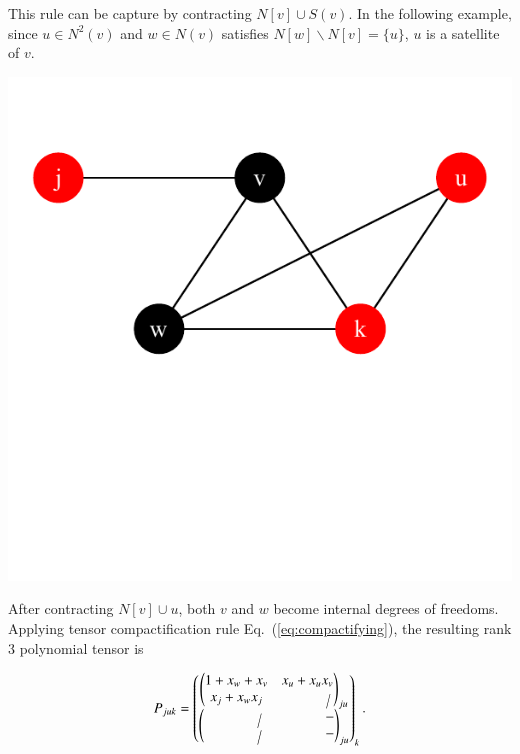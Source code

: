\documentclass[review,onefignum,onetabnum]{siamart190516}
\newcommand{\<}{\langle}
\renewcommand{\>}{\rangle}
\newcommand{\Eq}[1]{Eq.~(\ref{#1})}
\newcounter{example}
\begin{document}
This rule can be capture by contracting $N[v] \cup S(v)$.
In the following example, since $u \in N^2(v)$ and $w \in N(v)$ satisfies $N[w] \backslash N[v] = \{u\}$, $u$ is a satellite of $v$.

\centerline{\includegraphics[width=0.4\columnwidth,trim={0 3.5cm 0 1cm},clip]{../notebooks/satellite.pdf}}

After contracting $N[v] \cup u$, both $v$ and $w$ become internal degrees of freedoms.
Applying tensor compactification rule \Eq{eq:compactifying}, the resulting rank 3 polynomial tensor is

\begin{align}
    P_{juk} = \left(\begin{matrix}
        \left(\begin{matrix}
        1+x_w+x_v & x_u + x_ux_v \\
        x_j+x_wx_j & ~~~~~~~~~~~~\cancel{}
        \end{matrix}\right)_{ju}\\
        \left(\begin{matrix}
        ~~~~~~~~~~~~~~~~\cancel{} & ~~~~~~~~~~~~~~~- \\
        ~~~~~~~~~~~~~~~~\cancel{} & ~~~~~~~~~~~~~~~-
        \end{matrix}\right)_{ju}
    \end{matrix}\right)_{k}.
\end{align}
\end{document}
